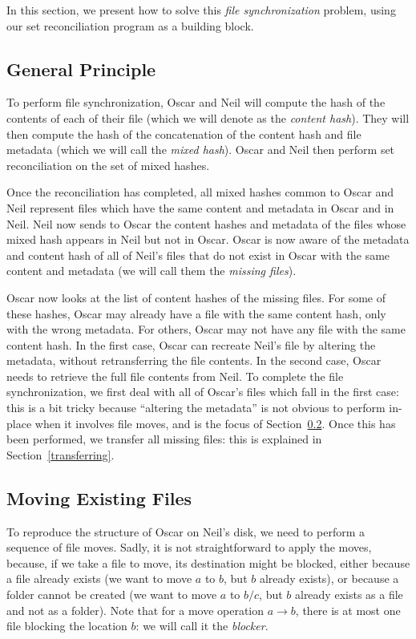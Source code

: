 \documentclass[11pt]{llncs}
\begin{document}
In this section, we present how to solve this \emph{file synchronization}
problem, using our set reconciliation program as a building block.

\subsection{General Principle}

To perform file synchronization, Oscar and Neil will compute the hash of the
contents of each of their file (which we will denote as the \emph{content
hash}). They will then compute the hash of the concatenation of the content hash
and file metadata (which we will call the \emph{mixed hash}). Oscar and Neil
then perform set reconciliation on the set of mixed hashes.

Once the reconciliation has completed, all mixed hashes common to Oscar and Neil
represent files which have the same content and metadata in Oscar and in Neil.
Neil now sends to Oscar the content hashes and metadata of the files whose mixed
hash appears in Neil but not in Oscar. Oscar is now aware of the metadata and
content hash of all of Neil's files that do not exist in Oscar with the same
content and metadata (we will call them the \emph{missing files}).

Oscar now looks at the list of content hashes of the missing files. For some of
these hashes, Oscar may already have a file with the same content hash, only
with the wrong metadata. For others, Oscar may not have any file with the same
content hash. In the first case, Oscar can recreate Neil's file by altering the
metadata, without retransferring the file contents. In the second case, Oscar
needs to retrieve the full file contents from Neil. To complete the file
synchronization, we first deal with all of Oscar's files which fall in the first
case: this is a bit tricky because ``altering the metadata'' is not obvious to
perform in-place when it involves file moves, and is the focus of
Section~\ref{moving}. Once this has been performed, we transfer all missing
files: this is explained in Section~\ref{transferring}.

\subsection{Moving Existing Files}
\label{moving}

To reproduce the structure of Oscar on Neil's disk, we need to perform a sequence of file moves. Sadly, it is not straightforward to apply the moves, because, if we take a file to move, its destination might be blocked, either because a file already exists (we want to move $a$ to $b$, but $b$ already exists), or because a folder cannot be created (we want to move $a$ to $b/c$, but $b$ already exists as a file and not as a folder). Note that for a move operation $a \rightarrow b$, there is at most one file blocking the location $b$: we will call it the \textit{blocker}.
\end{document}

